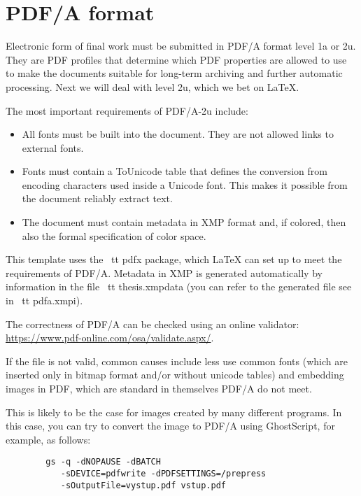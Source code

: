 \chapter{PDF/A format}

Electronic form of final
work must be submitted in PDF/A format level 1a or 2u. They are
PDF profiles that determine which PDF properties are allowed to use
to make the documents suitable for long-term archiving and further automatic
processing. Next we will deal with level 2u, which we bet on \LaTeX{}.

The most important requirements of PDF/A-2u include:

\begin{itemize}

\item All fonts must be built into the document. They are not allowed
links to external fonts.

\item Fonts must contain a ToUnicode table that defines the conversion from encoding
characters used inside a Unicode font. This makes it possible from the document
reliably extract text.

\item The document must contain metadata in XMP format and, if colored,
then also the formal specification of color space.

\end{itemize}

This template uses the {\ tt pdfx} package, which \LaTeX{} can set up
to meet the requirements of PDF/A. Metadata in XMP is generated automatically by
information in the file {\ tt thesis.xmpdata} (you can refer to the generated file
see in {\ tt pdfa.xmpi}).

The correctness of PDF/A can be checked using an online validator: \url{https://www.pdf-online.com/osa/validate.aspx/}.

If the file is not valid, common causes include less use
common fonts (which are inserted only in bitmap format and/or without
unicode tables) and embedding images in PDF, which are standard in themselves
PDF/A do not meet.

This is likely to be the case for images created by many different programs.
In this case, you can try to convert the image to PDF/A using
GhostScript, for example, as follows:

\begin{verbatim}
        gs -q -dNOPAUSE -dBATCH
           -sDEVICE=pdfwrite -dPDFSETTINGS=/prepress
           -sOutputFile=vystup.pdf vstup.pdf
\end{verbatim}
